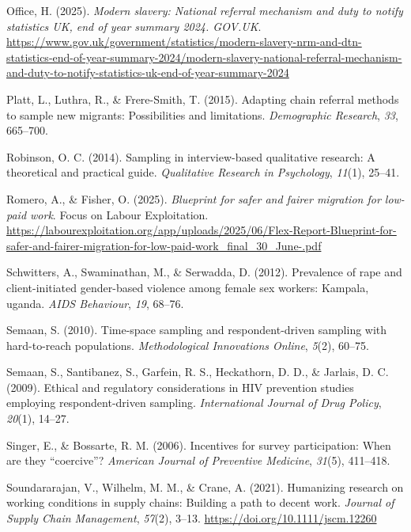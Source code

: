 \documentclass[
  12pt,
]{article}
\newlength{\cslhangindent}
\newenvironment{CSLReferences}[2] %
 {\begin{list}{}{%
  \setlength{\itemindent}{0pt}
  \setlength{\leftmargin}{0pt}
  \setlength{\parsep}{0pt}
  \ifodd #1
   \setlength{\leftmargin}{\cslhangindent}
   \setlength{\itemindent}{-1\cslhangindent}
  \fi
  \setlength{\itemsep}{#2\baselineskip}}}
 {\end{list}}
\theoremstyle{plain}
\theoremstyle{definition}
\begin{document}
\begin{CSLReferences}{1}{0}
Office, H. (2025). \emph{Modern slavery: National referral mechanism and
duty to notify statistics {UK}, end of year summary 2024. {GOV}.{UK}}.
\url{https://www.gov.uk/government/statistics/modern-slavery-nrm-and-dtn-statistics-end-of-year-summary-2024/modern-slavery-national-referral-mechanism-and-duty-to-notify-statistics-uk-end-of-year-summary-2024}

Platt, L., Luthra, R., \& Frere-Smith, T. (2015). Adapting chain
referral methods to sample new migrants: Possibilities and limitations.
\emph{Demographic Research}, \emph{33}, 665--700.

Robinson, O. C. (2014). Sampling in interview-based qualitative
research: A theoretical and practical guide. \emph{Qualitative Research
in Psychology}, \emph{11}(1), 25--41.

Romero, A., \& Fisher, O. (2025). \emph{Blueprint for safer and fairer
migration for low-paid work}. Focus on Labour Exploitation.
\url{https://labourexploitation.org/app/uploads/2025/06/Flex-Report-Blueprint-for-safer-and-fairer-migration-for-low-paid-work_final_30_June-.pdf}

Schwitters, A., Swaminathan, M., \& Serwadda, D. (2012). Prevalence of
rape and client-initiated gender-based violence among female sex
workers: Kampala, uganda. \emph{{AIDS} Behaviour}, \emph{19}, 68--76.

Semaan, S. (2010). Time-space sampling and respondent-driven sampling
with hard-to-reach populations. \emph{Methodological Innovations
Online}, \emph{5}(2), 60--75.

Semaan, S., Santibanez, S., Garfein, R. S., Heckathorn, D. D., \&
Jarlais, D. C. (2009). Ethical and regulatory considerations in {HIV}
prevention studies employing respondent-driven sampling.
\emph{International Journal of Drug Policy}, \emph{20}(1), 14--27.

Singer, E., \& Bossarte, R. M. (2006). Incentives for survey
participation: When are they {``coercive''}? \emph{American Journal of
Preventive Medicine}, \emph{31}(5), 411--418.

Soundararajan, V., Wilhelm, M. M., \& Crane, A. (2021). Humanizing
research on working conditions in supply chains: Building a path to
decent work. \emph{Journal of Supply Chain Management}, \emph{57}(2),
3--13. \url{https://doi.org/10.1111/jscm.12260}


\end{CSLReferences}
\end{document}
